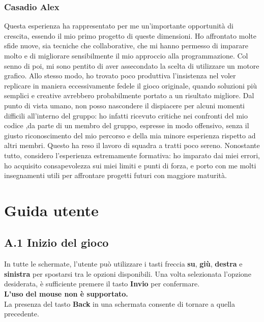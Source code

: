 \documentclass[a4paper,12pt]{report}
\begin{document}
{{\subsection{Casadio Alex}
Questa esperienza ha rappresentato per me un’importante opportunità di crescita, essendo il mio primo progetto di queste dimensioni. Ho affrontato molte sfide nuove, sia tecniche che collaborative, che mi hanno permesso di imparare molto e di migliorare sensibilmente il mio approccio alla programmazione.
Col senno di poi, mi sono pentito di aver assecondato la scelta di utilizzare un motore grafico. Allo stesso modo, ho trovato poco produttiva l’insistenza nel voler replicare in maniera eccessivamente fedele il gioco originale, quando soluzioni più semplici e creative avrebbero probabilmente portato a un risultato migliore.
Dal punto di vista umano, non posso nascondere il dispiacere per alcuni momenti difficili all’interno del gruppo: ho infatti ricevuto critiche nei confronti del mio codice ,da parte di un membro del gruppo, espresse in modo offensivo, senza il giusto riconoscimento del mio percorso e della mia minore esperienza rispetto ad altri membri. Questo ha reso il lavoro di squadra a tratti poco sereno.
Nonostante tutto, considero l’esperienza estremamente formativa: ho imparato dai miei errori, ho acquisito consapevolezza sui miei limiti e punti di forza, e porto con me molti insegnamenti utili per affrontare progetti futuri con maggiore maturità.

 
\appendix
\chapter{Guida utente}

\section*{A.1 Inizio del gioco}
In tutte le schermate, l’utente può utilizzare i tasti freccia \textbf{su}, \textbf{giù}, \textbf{destra} e \textbf{sinistra} per spostarsi tra le opzioni disponibili.  
Una volta selezionata l’opzione desiderata, è sufficiente premere il tasto \textbf{Invio} per confermare.\\
\textbf{L’uso del mouse non è supportato.}\\
La presenza del tasto \textbf{Back} in una schermata consente di tornare a quella precedente.

}}
\end{document}
